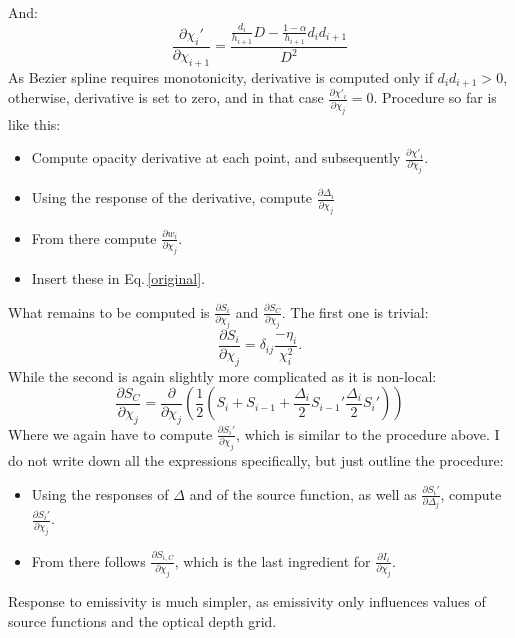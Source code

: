 \documentclass[a4paper,10pt]{article}
\begin{document}
And:
\begin{equation}
 \frac{\partial \chi_i'}{\partial \chi_{i+1}} = \frac{\frac{d_{i}}{h_{i+1}}D - \frac{1-\alpha}{h_{i+1}}d_i d_{i+1}}{D^2}
\end{equation}
As Bezier spline requires monotonicity, derivative is computed only if $d_i d_{i+1} > 0$, otherwise, derivative is set to zero, and in that case $\frac{\partial \chi'_i}{\partial \chi_j} = 0$.
Procedure so far is like this:
\begin{itemize}
 \item Compute opacity derivative at each point, and subsequently $\frac{\partial \chi'_i}{\partial \chi_j}$.
 \item Using the response of the derivative, compute $\frac{\partial \Delta_i}{\partial \chi_j}$
 \item From there compute $\frac{\partial w_i}{\partial \chi_j}$. 
 \item Insert these in Eq.\,\ref{original}.
\end{itemize}
What remains to be computed is $\frac{\partial S_i}{\partial \chi_j}$ and $\frac{\partial S_C}{\partial \chi_j}$. The first one is trivial:
\begin{equation}
 \frac{\partial S_i}{\partial \chi_j} = \delta_{ij} \frac{-\eta_i}{\chi_i^2}.
\end{equation}
While the second is again slightly more complicated as it is non-local:
\begin{equation}
\frac{\partial S_C}{\partial \chi_j} = \frac{\partial}{\partial \chi_j}\left (\frac{1}{2} (S_i + S_{i-1} + \frac{\Delta_i}{2} S_{i-1}' \frac{\Delta_i}{2} S_i')\right ) 
\end{equation}
Where we again have to compute $\frac{\partial S_i'}{\partial \chi_j}$, which is similar to the procedure above. I do not write down all the expressions specifically, but just outline the procedure: 
\begin{itemize}
 \item Using the responses of $\Delta$ and of the source function, as well as $\frac{\partial S_i'}{\partial \Delta_j}$, compute $\frac{\partial S_i'}{\partial \chi_j}$. 
 \item From there follows $\frac{\partial S_{i,C}}{\partial \chi_j}$, which is the last ingredient for $\frac{\partial I_i}{\partial \chi_j}$.
\end{itemize}

Response to emissivity is much simpler, as emissivity only influences values of source functions and the optical depth grid.
\end{document}
